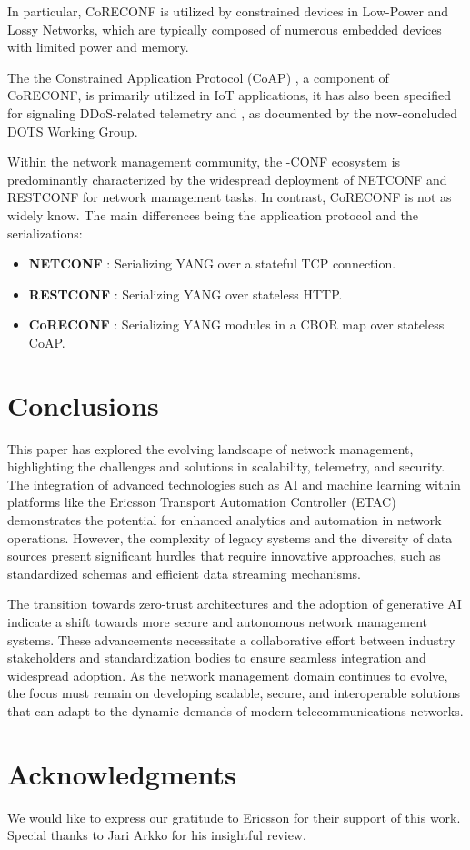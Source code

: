 \documentclass[10pt,sigconf]{iabart}
\begin{document}
In particular, CoRECONF is utilized by constrained devices in Low-Power and Lossy Networks, which are typically composed of numerous embedded devices with limited power and memory. 

The the Constrained Application Protocol (CoAP) \cite{RFC7252}, a component of CoRECONF, is primarily utilized in IoT applications, it has also been specified for signaling DDoS-related telemetry \cite{RFC9132} and \cite{RFC9362}, as documented by the now-concluded DOTS Working Group. 

Within the network management community, the -CONF ecosystem is predominantly characterized by the widespread deployment of NETCONF and RESTCONF for network management tasks. In contrast, CoRECONF is not as widely know. The main differences being the application protocol and the serializations:

\begin{itemize}
  \item \textbf{NETCONF} \cite{RFC6241}: Serializing YANG over a stateful TCP connection.    
  \item \textbf{RESTCONF} \cite{RFC8040}: Serializing YANG over stateless HTTP.
  \item \textbf{CoRECONF} \cite{draft-ietf-core-comi}: Serializing YANG modules in a CBOR \cite{RFC9254} map over stateless CoAP.
\end{itemize}



\section{Conclusions} \label{conclusions}


This paper has explored the evolving landscape of network management, highlighting the challenges and solutions in scalability, telemetry, and security. The integration of advanced technologies such as AI and machine learning within platforms like the Ericsson Transport Automation Controller (ETAC) demonstrates the potential for enhanced analytics and automation in network operations. However, the complexity of legacy systems and the diversity of data sources present significant hurdles that require innovative approaches, such as standardized schemas and efficient data streaming mechanisms.

The transition towards zero-trust architectures and the adoption of generative AI indicate a shift towards more secure and autonomous network management systems. These advancements necessitate a collaborative effort between industry stakeholders and standardization bodies to ensure seamless integration and widespread adoption. As the network management domain continues to evolve, the focus must remain on developing scalable, secure, and interoperable solutions that can adapt to the dynamic demands of modern telecommunications networks.

\section{Acknowledgments}

We would like to express our gratitude to Ericsson for their support of this work. Special thanks to Jari Arkko for his insightful review.



\end{document}
